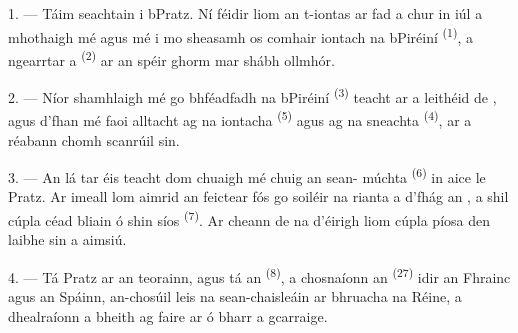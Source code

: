 %

\VUsaut{4.0mm}
\VUsaut{3.0mm}

\VUsaut{3.0mm}

\VUsaut{3.0mm}

1. --- Táim seachtain i bPratz. Ní féidir liom an t-iontas ar fad a chur in iúl a
mhothaigh mé agus mé i mo sheasamh os comhair  iontach na
bPiréiní \textsuperscript{(1)}, a ngearrtar a 
\textsuperscript{(2)} ar an spéir ghorm mar shábh ollmhór.

2. --- Níor shamhlaigh mé go bhféadfadh  na bPiréiní
\textsuperscript{(3)} teacht ar a leithéid de , agus d'fhan mé faoi
alltacht ag na  iontacha \textsuperscript{(5)} agus ag
na  sneachta \textsuperscript{(4)}, ar a réabann
 chomh scanrúil sin.

\VUsaut{3.0mm}
\VUsaut{3.0mm}

3. --- An lá tar éis teacht dom chuaigh mé chuig an sean- múchta
\textsuperscript{(6)} in aice le Pratz. Ar imeall lom aimrid an 
feictear fós go soiléir na rianta a d'fhág an , a shil cúpla céad
bliain ó shin síos  \textsuperscript{(7)}. Ar cheann de na
 d'éirigh liom cúpla píosa den laibhe sin a aimsiú.

4. --- Tá Pratz ar an teorainn, agus tá an 
\textsuperscript{(8)}, a chosnaíonn an  \textsuperscript{(27)} idir
an Fhrainc agus an Spáinn, an-chosúil leis na sean-chaisleáin ar bhruacha na
Réine, a dhealraíonn a bheith ag faire ar  ó bharr a gcarraige.

